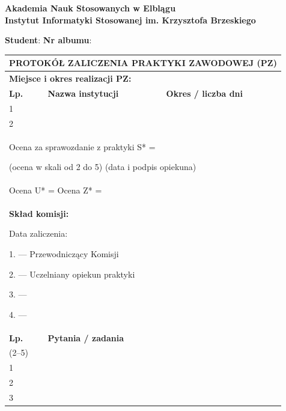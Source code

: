 \documentclass[11pt,a4paper]{article}
\newcommand{\fullrow}{\dimexpr\textwidth-2\tabcolsep-2\arrayrulewidth\relax}
\begin{document}
\noindent
\textbf{Akademia Nauk Stosowanych w Elblągu} \\
\textbf{Instytut Informatyki Stosowanej im. Krzysztofa Brzeskiego}

\vspace{1em}

\noindent \textbf{Student}: \dotfill \hfill \textbf{Nr albumu}: \dotfill

\vspace{1em}

\begin{tabularx}{\textwidth}{|p{0.8cm}|X|p{4.5cm}|}
\hline

\multicolumn{3}{|c|}{\textbf{\large PROTOKÓŁ ZALICZENIA PRAKTYKI ZAWODOWEJ (PZ)}} \\ \hline

\multicolumn{3}{|l|}{\textbf{Miejsce i okres realizacji PZ:}} \\ \hline

\textbf{Lp.} & \centering \textbf{Nazwa instytucji} & \centering \arraybackslash \textbf{Okres / liczba dni} \\ \hline

1 & & \\ \hline
2 & & \\ \hline

\multicolumn{3}{|p{\fullrow}|}{
Ocena za sprawozdanie z praktyki S* = \dotfill \hfill \dotfill

\small (ocena w skali od 2 do 5) \hfill (data i podpis opiekuna)
} \\ \hline

\multicolumn{3}{|p{\fullrow}|}{
Ocena U* = \dotfill \hfill Ocena Z* = \dotfill
} \\ \hline

\multicolumn{3}{|p{\fullrow}|}{
\textbf{Skład komisji:}

Data zaliczenia: \dotfill

1. \dotfill --- Przewodniczący Komisji

2. \dotfill --- Uczelniany opiekun praktyki

3. \dotfill --- \dotfill

4. \dotfill --- \dotfill
} \\ \hline

\textbf{Lp.} & \centering \textbf{Pytania / zadania} & \centering \arraybackslash \makecell{\textbf{Oceny cząstkowe} \\ (2--5)} \\ \hline

1 & & \\ \hline
2 & & \\ \hline
3 & & \\ \hline


\end{tabularx}
\end{document}
